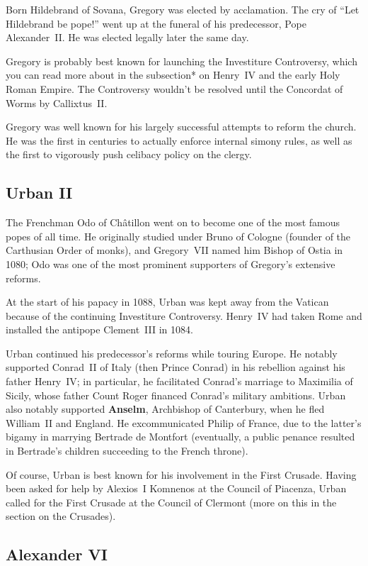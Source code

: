 Born Hildebrand of Sovana, Gregory was elected by acclamation.
The cry of ``Let Hildebrand be pope!'' went up at the funeral of his predecessor, Pope Alexander~II\@.
He was elected legally later the same day.

Gregory is probably best known for launching the Investiture Controversy,
which you can read more about in the subsection* on Henry~IV and the early Holy Roman Empire.
The Controversy wouldn't be resolved until the Concordat of Worms by Callixtus~II\@.

Gregory was well known for his largely successful attempts to reform the church.
He was the first in centuries to actually enforce internal simony rules,
as well as the first to vigorously push celibacy policy on the clergy.

\subsection*{Urban II}

The Frenchman Odo of Ch\^atillon went on to become one of the most famous popes of all time.
He originally studied under Bruno of Cologne (founder of the Carthusian Order of monks),
and Gregory~VII named him Bishop of Ostia in 1080;
Odo was one of the most prominent supporters of Gregory's extensive reforms.

At the start of his papacy in 1088,
Urban was kept away from the Vatican because of the continuing Investiture Controversy.
Henry~IV had taken Rome and installed the antipope Clement~III in 1084.

Urban continued his predecessor's reforms while touring Europe.
He notably supported Conrad~II of Italy (then Prince Conrad)
in his rebellion against his father Henry~IV\@;
in particular, he facilitated Conrad's marriage to Maximilia of Sicily,
whose father Count Roger financed Conrad's military ambitions.
Urban also notably supported \textbf{Anselm}, Archbishop of Canterbury,
when he fled William~II and England.
He excommunicated Philip of France, due to the latter's bigamy in marrying Bertrade de Montfort
(eventually, a public penance resulted in Bertrade's children succeeding to the French throne).

Of course, Urban is best known for his involvement in the First Crusade.
Having been asked for help by Alexios~I Komnenos at the Council of Piacenza,
Urban called for the First Crusade at the Council of Clermont
(more on this in the section on the Crusades).

\subsection*{Alexander VI}

